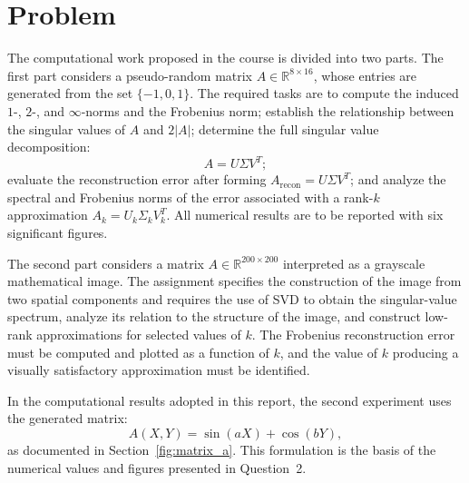 \section{Problem}

The computational work proposed in the course is divided into two parts. The first part considers a pseudo-random matrix $A \in \mathbb{R}^{8\times16}$, whose entries are generated from the set $\{-1,0,1\}$. The required tasks are to compute the induced $1$-, $2$-, and $\infty$-norms and the Frobenius norm; establish the relationship between the singular values of $A$ and $2|A|$; determine the full singular value decomposition:
\[
A = U\Sigma V^T;
\]
evaluate the reconstruction error after forming $A_{\text{recon}} = U\Sigma V^T$; and analyze the spectral and Frobenius norms of the error associated with a rank-$k$ approximation $A_k = U_k\Sigma_k V_k^T$. All numerical results are to be reported with six significant figures.

The second part considers a matrix $A \in \mathbb{R}^{200\times200}$ interpreted as a grayscale mathematical image. The assignment specifies the construction of the image from two spatial components and requires the use of SVD to obtain the singular-value spectrum, analyze its relation to the structure of the image, and construct low-rank approximations for selected values of $k$. The Frobenius reconstruction error must be computed and plotted as a function of $k$, and the value of $k$ producing a visually satisfactory approximation must be identified.

In the computational results adopted in this report, the second experiment uses the generated matrix:
\[
A(X,Y) = \sin(aX) + \cos(bY),
\]
as documented in Section~\ref{fig:matrix_a}. This formulation is the basis of the numerical values and figures presented in Question~2.
